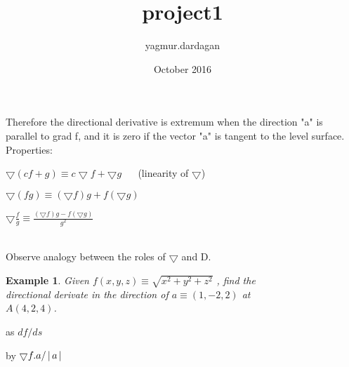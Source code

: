 \documentclass{amsbook}
\title{project1}
\author{yagmur.dardagan }
\date{October 2016}
\newtheorem{example}{Example} %
\begin{document}


\noindent Therefore the directional derivative is extremum when the direction "a" is \\
parallel to grad f, and it is zero if the vector "a" is tangent to the level surface. \\

  Properties:
 
 \begin{hEnumerateArabic}
 
    
     \item  $ \bigtriangledown(cf +g) 	\equiv c \bigtriangledown f + \bigtriangledown g $  $ \quad$    (linearity of $\bigtriangledown$)
     \item $\bigtriangledown(f g) 	\equiv (\bigtriangledown f) g + f(\bigtriangledown g)$
     \item $ \bigtriangledown \frac{f}{g} 	\equiv \frac{(\bigtriangledown f)g - f(\bigtriangledown g)}{g^2} $ \\ \\
     
 \end{hEnumerateArabic}
 
 \indent Observe analogy between the roles of $\bigtriangledown$ and D. \\ 
 
\begin{example}
    Given $f(x, y, z) 	\equiv \sqrt{x^2 + y^2 + z^2}$ , find the \\ directional derivate in the direction of $ a 	\equiv (1, -2, 2)$ at \\
    $A(4, 2, 4)$.\\
\end{example}

\begin{hEnumerateAlpha}
    \begin{multicols}{2}  
        \item as $df/ds$ $\quad \quad$
        \columnbreak
        \item by $\bigtriangledown f.a/ \left \lvert \, a \, \right \rvert$
    \end{multicols}    
\end{hEnumerateAlpha}
\end{document}
